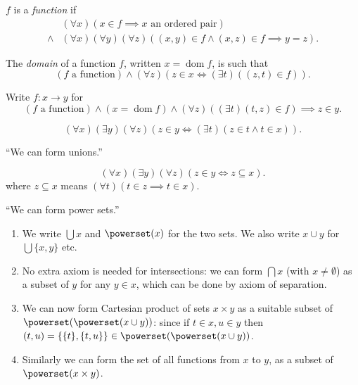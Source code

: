 \documentclass[a4paper]{article}
\DeclareMathOperator{\dom}{dom}%
\begin{document}
\begin{definition}[Function]
  \(f\) is a \emph{function} if
  \begin{align*}
    &(\forall x) (x \in f \implies x \text{ an ordered pair}) \\
    \land & (\forall x) (\forall y) (\forall z) ((x, y) \in f \land (x, z) \in f \implies y = z).
  \end{align*}

  The \emph{domain} of a function \(f\), written \(x = \dom f\), is such that
  \[
    (f \text{ a function}) \land (\forall z) (z \in x \iff (\exists t) ((z, t) \in f)).
  \]

  Write \(f: x \to y\) for
  \[
    (f \text{ a function}) \land (x = \dom f) \land (\forall z) ((\exists t) (t, z) \in f) \implies z \in y.
  \]
\end{definition}

\begin{axiom*}
  \[
    (\forall x) (\exists y) (\forall z) (z \in y \iff (\exists t) (z \in t \land t \in x)).
  \]
\end{axiom*}
``We can form unions.''

\begin{axiom*}
  \[
    (\forall x) (\exists y) (\forall z) (z \in y \iff z \subseteq x).
  \]
  where \(z \subseteq x\) means \((\forall t) (t \in z \implies t \in x)\).
\end{axiom*}
``We can form power sets.''

\begin{note}\leavevmode
  \begin{enumerate}
  \item We write \(\bigcup x\) and \(\powerset(x)\) for the two sets. We also write \(x \cup y\) for \(\bigcup \{x, y\}\) etc.
  \item No extra axiom is needed for intersections: we can form \(\bigcap x\) (with \(x \neq \emptyset\)) as a subset of \(y\) for any \(y \in x\), which can be done by axiom of separation.
  \item We can now form Cartesian product of sets \(x \times y\) as a suitable subset of \(\powerset(\powerset(x \cup y))\): since if \(t \in x, u \in y\) then \((t, u) = \{\{t\}, \{t, u\}\} \in \powerset(\powerset(x \cup y))\).
  \item Similarly we can form the set of all functions from \(x\) to \(y\), as a subset of \(\powerset(x \times y)\).
  \end{enumerate}
\end{note}
\end{document}
